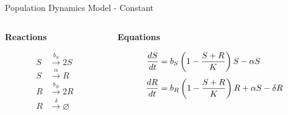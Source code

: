 \documentclass[11pt]{beamer}              %
\begin{document}
\begin{frame}{Population Dynamics Model - Constant}
  \begin{columns}
    \begin{column}{.3\paperwidth}

      \centerline{\textbf{Reactions}}
      \begin{minipage}[c][.52\textheight][c]{\linewidth}

        \begin{align*}
          S & \stackrel{b_S}{\rightarrow} 2S \\
          S & \stackrel{\alpha}{\rightarrow}  R \\
          R & \stackrel{b_R}{\rightarrow} 2R \\
          R & \stackrel{\delta}{\rightarrow} \varnothing
        \end{align*}
      \end{minipage}

      \end{column} \vrule
      \begin{column}{.6\paperwidth}

        \centerline{\textbf{Equations}}
        \begin{minipage}[c][.52\textheight][c]{\linewidth}
          \begin{align*}
            \frac{dS}{dt} & = b_S \left(1 - \frac{S + R}{K}\right)S - \alpha
            \color{black} S \\[0.8ex]
            \frac{dR}{dt} & = b_R \left(1 - \frac{S + R}{K}\right)R + \alpha
            \color{black} S - \delta R \\[0.8ex]
          \end{align*}
        \end{minipage}
      \end{column}
    \end{columns}
  \end{frame}
\end{document}
